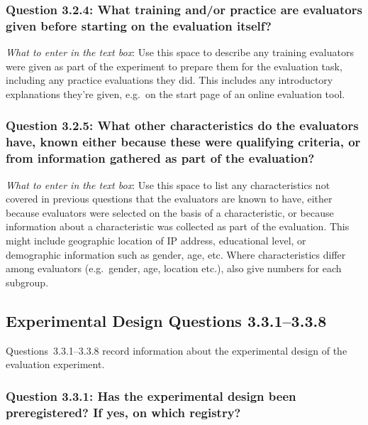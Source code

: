 \documentclass[11pt,a4paper]{article}
\begin{document}
\vspace{-.3cm}
\subsubsection*{Question 3.2.4: What training and/or practice are evaluators given before starting on the evaluation itself?}

\noindent\textit{What to enter in the text box}: Use this space to describe any training evaluators were given as part of the experiment to prepare them for the evaluation task, including any practice evaluations they did. This includes any introductory explanations they're given, e.g.\ on the start page of an online evaluation tool.

\vspace{-.3cm}
\subsubsection*{Question 3.2.5:  What other characteristics do the evaluators have, known either because these were qualifying criteria, or from information gathered as part of the evaluation?}

\noindent\textit{What to enter in the text box}: Use this space to list any characteristics not covered in previous questions that the evaluators are known to have, either because evaluators were selected on the basis of a characteristic, or because information about a characteristic was collected as part of the evaluation. This might include geographic location of IP address, educational level, or demographic information such as gender, age, etc. Where characteristics differ among evaluators (e.g.\ gender, age, location etc.), also give numbers for each subgroup.


\subsection{Experimental Design Questions 3.3.1--3.3.8}

Questions~3.3.1--3.3.8 record information about the experimental design of the evaluation experiment.

\vspace{-.3cm}
\subsubsection*{Question 3.3.1:  Has the experimental design been preregistered? If yes, on which registry?}
\end{document}
